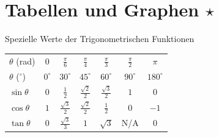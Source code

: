 \section*{Tabellen und Graphen \texorpdfstring{$\star$}{*}}

\begin{minipage}{\linewidth}
\Tab Spezielle Werte der Trigonometrischen Funktionen

\begin{tabular}{l | c c c c c c}
    $\theta$ (rad) & $0$ & $\frac{\pi}{6}$ & $\frac{\pi}{4}$ & $\frac{\pi}{3}$ & $\frac{\pi}{2}$ & $\pi$ \\[1ex]
    $\theta$ ($^\circ$) & $0^\circ$ & $30^\circ$ & $45^\circ$ & $60^\circ$ & $90^\circ$ & $180^\circ$ \\[0.5ex]
    \hline
    $\sin\theta$ & $0$ & $\frac{1}{2}$ & $\frac{\sqrt{2}}{2}$ & $\frac{\sqrt{3}}{2}$ & $1$ & $0$ \\[1ex]
    $\cos\theta$ & $1$ & $\frac{\sqrt{3}}{2}$ & $\frac{\sqrt{2}}{2}$ & $\frac{1}{2}$ & $0$ & $-1$ \\[1ex]
    $\tan\theta$ & $0$ & $\frac{\sqrt{3}}{3}$ & $1$ & $\sqrt{3}$ & N/A & $0$
\end{tabular}
\end{minipage}

